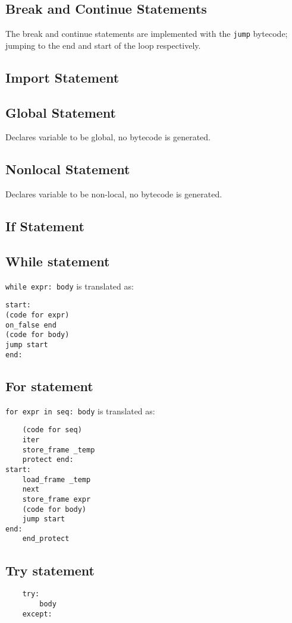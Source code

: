 \documentclass[a4paper,10pt]{article}
\begin{document}
\subsection{Break and Continue Statements}
The break and continue statements are implemented with the \verb|jump| bytecode; jumping to the end and start of the loop respectively.

\subsection{Import Statement}

\subsection{Global Statement}
Declares variable to be global, no bytecode is generated.
\subsection{Nonlocal Statement}
Declares variable to be non-local, no bytecode is generated.
\subsection{If Statement}

\subsection{While statement}
\verb|while expr: body| is translated as:
\begin{verbatim}
start:
(code for expr)
on_false end
(code for body)
jump start
end:
\end{verbatim}

\subsection{For statement}
\verb|for expr in seq: body|  is translated as:
\begin{verbatim}
    (code for seq)
    iter
    store_frame _temp
    protect end:
start:
    load_frame _temp
    next
    store_frame expr
    (code for body)
    jump start
end:
    end_protect
\end{verbatim}

\subsection{Try statement}
\begin{verbatim}
    try:
        body
    except:
\end{verbatim}
\end{document}
